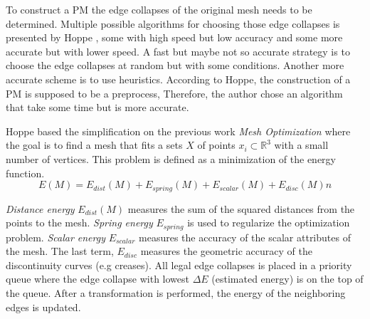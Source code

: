 To construct a PM the edge collapses of the original mesh needs to be determined. Multiple possible algorithms for choosing those edge collapses is presented by Hoppe \cite{hoppe1996progressive}, some with high speed but low accuracy and some more accurate but with lower speed. A fast but maybe not so accurate strategy is to choose the edge collapses at random but with some conditions. Another more accurate scheme is to use heuristics. According to Hoppe, the construction of a PM is supposed to be a preprocess, Therefore, the author chose an algorithm that take some time but is more accurate.

Hoppe based the simplification on the previous work \emph{Mesh Optimization} \cite{hoppe1993mesh} where the goal is to find a mesh that fits a sets $X$ of points \(x_i \subset \mathbb{R}^3\) with a small number of vertices. This problem is defined as a minimization of the energy function.
\begin{equation}
  E(M) = E_{dist}(M) + E_{spring}(M) + E_{scalar}(M) + E_{disc}(M)n
\end{equation}

\emph{Distance energy} $E_{dist}(M)$ measures the sum of the squared distances from the points to the mesh. \emph{Spring energy} $E_{spring}$ is used to regularize the optimization problem. \emph{Scalar energy} $E_{scalar}$ measures the accuracy of the scalar attributes of the mesh. The last term, $E_{disc}$ measures the geometric accuracy of the discontinuity curves (e.g creases). All legal edge collapses is placed in a priority queue where the edge collapse with lowest $\Delta E$ (estimated energy) is on the top of the queue. After a transformation is performed, the energy of the neighboring edges is updated.

